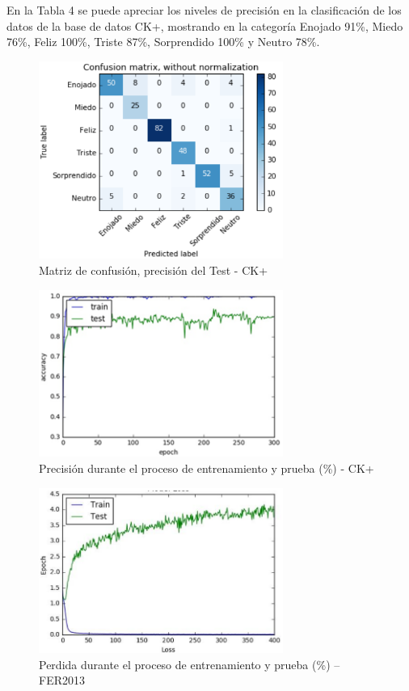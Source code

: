 En la Tabla 4 se puede apreciar los niveles de precisión en la clasificación de los
datos de la base de datos CK+, mostrando en la categoría Enojado 91\%, Miedo 76\%,
Feliz 100\%, Triste 87\%, Sorprendido 100\% y Neutro 78\%.

\begin{figure}[H]
		\centering
		\includegraphics[width=80mm]{./Imagenes/matriz_confusion_ck+.png}
		\caption{Matriz de confusión, precisión del Test - CK+}
		\label{fig:matriz_confusion_ck+}
\end{figure}

\begin{figure}[H]
		\centering
		\includegraphics[width=80mm]{./Imagenes/precision_ck+.png}
		\caption{Precisión durante el proceso de entrenamiento y prueba (\%) - CK+}
		\label{fig:precision-ck+}
\end{figure}

\begin{figure}[H]
		\centering
		\includegraphics[width=80mm]{./Imagenes/perdida_ck+.png}
		\caption{Perdida durante el proceso de entrenamiento y prueba (\%) – FER2013}
		\label{fig:perdida_ck+}
\end{figure}

